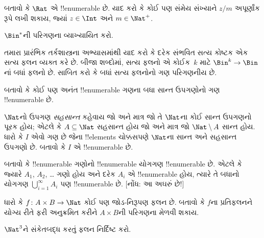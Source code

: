 \documentclass[../../../include/open-logic-section]{subfiles}
\begin{document}
\begin{prob}
બતાવો કે $\Rat$ એ !!{enumerable} છે.
યાદ કરો કે કોઈ પણ સંમેય સંખ્યાને $z/m$ અપૂર્ણાંક
રૂપે લખી શકાય, જ્યાં $z \in \Int$ અને $m \in \Nat^+$.
\end{prob}

\begin{prob}
$\Bin^*$ની પરિગણના વ્યાખ્યાયિત કરો.
\end{prob}

\begin{prob}
તમારા પ્રારંભિક તર્કશાસ્ત્રના અભ્યાસમાંથી યાદ કરો
કે દરેક સંભવિત સત્ય કોષ્ટક એક સત્ય ફલન વ્યક્ત
કરે છે. બીજા શબ્દોમાં, સત્ય ફલનો એ કોઈક~$k$
માટે $\Bin^k \to \Bin$નાં બધાં ફલનો છે.
સાબિત કરો કે બધાં સત્ય ફલનોનો ગણ પરિગણનીય છે.
\end{prob}

\begin{prob}
બતાવો કે કોઈ પણ અનંત !!{enumerable} ગણના
બધા સાન્ત ઉપગણોનો ગણ !!{enumerable} છે.
\end{prob}

\begin{prob}
$\Nat$નો ઉપગણ \emph{સહસાન્ત} કહેવાય જો અને માત્ર
જો તે $\Nat$ના કોઈ સાન્ત ઉપગણનો પૂરક હોય; એટલે કે
$A \subseteq \Nat$ સહસાન્ત હોય જો અને માત્ર જો
$\Nat\setminus A$ સાન્ત હોય. ધારો કે $I$ એવો ગણ
છે જેના !!{element}s ચોક્કસપણે $\Nat$ના સાન્ત
અને સહસાન્ત ઉપગણો છે. બતાવો કે $I$ એ !!{enumerable} છે.
\end{prob}

\begin{prob}
બતાવો કે !!{enumerable} ગણોનો !!{enumerable}
યોગગણ !!{enumerable} છે. એટલે કે જ્યારે
$A_1$, $A_2$, \dots{} ગણો હોય અને દરેક $A_i$
એ !!{enumerable} હોય, ત્યારે તે બધાનો યોગગણ
$\bigcup_{i=1}^\infty
A_i$ પણ !!{enumerable} છે. [નોંધ: આ અઘરું છે!]
\end{prob}

\begin{prob}
ધારો કે $f \colon A \times B \to \Nat$ કોઈ પણ
જોડ-નિરૂપણ ફલન છે. બતાવો કે $f$ના પ્રતિફલનને યોગ્ય રીતે ફરી અનુક્રમિત કરીને
$A \times B$ની પરિગણના મેળવી શકાય.

\end{prob}

\begin{prob}
$\Nat^3$ને સંકેતબદ્ધ કરતું ફલન નિર્દિષ્ટ કરો.
\end{prob}
\end{document}
